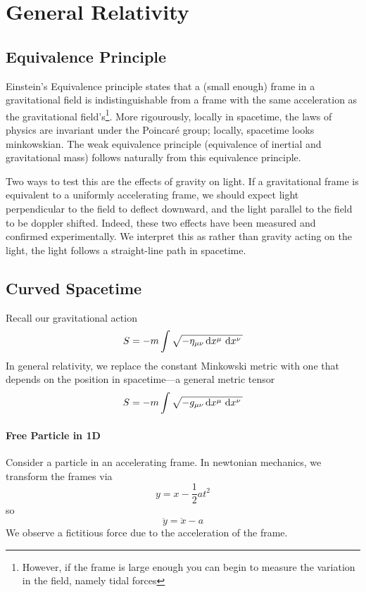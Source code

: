 \chapter{General Relativity}
\section{Equivalence Principle}
Einstein's Equivalence principle states that a (small enough) frame in a gravitational field is indistinguishable from a frame with the same acceleration as the gravitational field's\footnote{However, if the frame is large enough you can begin to measure the variation in the field, namely tidal forces}.
More rigourously, locally in spacetime, the laws of physics are invariant under the Poincar\'e group; locally, spacetime looks minkowskian. The weak equivalence principle (equivalence of inertial and gravitational mass) follows naturally from this equivalence principle.

Two ways to test this are the effects of gravity on light. If a gravitational frame is equivalent to a uniformly accelerating frame, we should expect light perpendicular to the field to deflect downward, and the light parallel to the field to be doppler shifted. Indeed, these two effects have been measured and confirmed experimentally. We interpret this as rather than gravity acting on the light, the light follows a straight-line path in spacetime.

\section{Curved Spacetime}
Recall our gravitational action
\[S = -m\int\sqrt{-\eta_{\mu\nu}\d{x^\mu}\d{x^\nu}}\]
In general relativity, we replace the constant Minkowski metric with one that depends on the position in spacetime---a general metric tensor
\begin{equation}
	S = -m\int\sqrt{-g_{\mu\nu}\d{x^\mu}\d{x^\nu}}
\end{equation}

\subsubsection{Free Particle in 1D}
Consider a particle in an accelerating frame. In newtonian mechanics, we transform the frames via
\[y = x-\frac{1}{2}at^2\]
so
\[\ddot y = \ddot x - a\]
We observe a fictitious force due to the acceleration of the frame.

